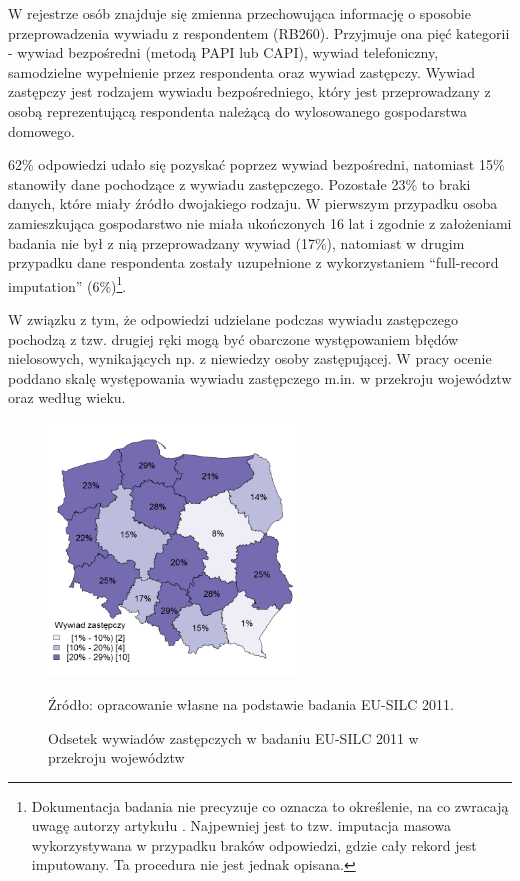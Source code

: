W rejestrze osób znajduje się zmienna przechowująca informację o sposobie przeprowadzenia wywiadu z respondentem (RB260). Przyjmuje ona pięć kategorii - wywiad bezpośredni (metodą PAPI lub CAPI), wywiad telefoniczny, samodzielne wypełnienie przez respondenta oraz wywiad zastępczy. Wywiad zastępczy jest rodzajem wywiadu bezpośredniego, który jest przeprowadzany z osobą reprezentującą respondenta należącą do wylosowanego gospodarstwa domowego.

62\% odpowiedzi udało się pozyskać poprzez wywiad bezpośredni, natomiast 15\% stanowiły dane pochodzące z wywiadu zastępczego. Pozostałe 23\% to braki danych, które miały źródło dwojakiego rodzaju. W pierwszym przypadku osoba zamieszkująca gospodarstwo nie miała ukończonych 16 lat i zgodnie z założeniami badania nie był z nią przeprowadzany wywiad (17\%), natomiast w drugim przypadku dane respondenta zostały uzupełnione z wykorzystaniem ``full-record imputation'' (6\%)\footnote{Dokumentacja badania nie precyzuje co oznacza to określenie, na co zwracają uwagę autorzy artykułu \citep{iacovou2012}. Najpewniej jest to tzw. imputacja masowa wykorzystywana w przypadku braków odpowiedzi, gdzie cały rekord jest imputowany. Ta procedura nie jest jednak opisana.}.

W związku z tym, że odpowiedzi udzielane podczas wywiadu zastępczego pochodzą z tzw. drugiej ręki mogą być obarczone występowaniem błędów nielosowych, wynikających np. z niewiedzy osoby zastępującej. W pracy ocenie poddano skalę występowania wywiadu zastępczego m.in. w przekroju województw oraz według wieku.

\begin{figure}[ht]
\centering
\includegraphics[width=0.6\textwidth]{04_wykresy/wywiad-woj.png}
\caption{Odsetek wywiadów zastępczych w badaniu EU-SILC 2011 w przekroju województw}
\small{Źródło: opracowanie własne na podstawie badania EU-SILC 2011.}
\label{fig:wywiad_woj}
\end{figure}

